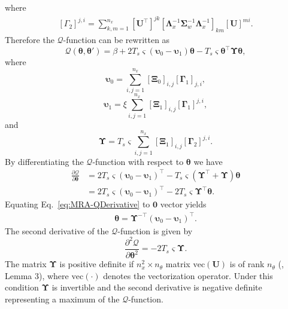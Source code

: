 \documentclass[review,authoryear,3p]{elsarticle}
\begin{document}
where
\begin{align}
\left[ \Gamma_2\right] ^{j,i}=\sum_{k,m=1}^{n_x}[\mathbf U^{\top}]^{jk} \left[\boldsymbol\Lambda_x^{-1}\boldsymbol\Sigma_w^{-1}\boldsymbol\Lambda_x^{-1} \right]_{km}[\mathbf U]^{mi}.
\end{align}
Therefore the $\mathcal Q$-function can be rewritten as
\begin{equation}\label{eq:MRA-QCompact}
\mathcal Q\left(\boldsymbol \theta,\boldsymbol\theta'\right)=\beta+2T_s\varsigma\left(\boldsymbol\upsilon_0-\boldsymbol\upsilon_1\right)\boldsymbol\theta-T_s\varsigma\boldsymbol\theta^\top\boldsymbol\Upsilon\boldsymbol\theta,
\end{equation}
where
\begin{equation}\label{eq:epsilon0}
\boldsymbol\upsilon_0=\sum_{i,j=1}^{n_x}[\boldsymbol\Xi_0]_{i,j}[\boldsymbol\Gamma_1]_{j,i},
\end{equation}
\begin{equation}\label{eq:epsilon1}
\boldsymbol\upsilon_1=\xi\sum_{i,j=1}^{n_x}[\boldsymbol\Xi_1]_{i,j}[\boldsymbol\Gamma_1]^{j,i},
\end{equation}                                                                                 
and
\begin{equation}\label{eq:Epsilon}
\boldsymbol\Upsilon=T_s\varsigma\sum_{i,j=1}^{n_x}[\boldsymbol\Xi_1]_{i,j}[\boldsymbol\Gamma_2]^{j,i}.
\end{equation}
By differentiating the $\mathcal Q$-function with respect to $\boldsymbol\theta$ we have
\begin{align}\label{eq:MRA-QDerivative}
\frac{\partial \mathcal Q}{\partial \boldsymbol\theta}&=2T_s\varsigma(\boldsymbol\upsilon_0-\boldsymbol\upsilon_1)^\top-T_s\varsigma(\boldsymbol\Upsilon^\top+\boldsymbol\Upsilon)\boldsymbol\theta \nonumber \\
&=2T_s\varsigma(\boldsymbol\upsilon_0-\boldsymbol\upsilon_1)^\top-2T_s\varsigma\boldsymbol\Upsilon^\top\boldsymbol\theta.
\end{align}
Equating Eq.~\eqref{eq:MRA-QDerivative} to $\mathbf 0$ vector yields
\begin{align}\label{eq:MRA-thetahat}
\boldsymbol \theta= \boldsymbol\Upsilon^{-\top}(\boldsymbol\upsilon_0-\boldsymbol\upsilon_1)^\top.
\end{align}
The second derivative of the $\mathcal Q$-function is given by
\begin{equation}
\frac{\partial^2\mathcal Q}{\partial\boldsymbol\theta^2}=-2T_s\varsigma\boldsymbol\Upsilon.
\end{equation}
The matrix $\boldsymbol\Upsilon$ is positive definite if $n_x^2\times n_{\theta}$ matrix $\mathrm{vec}(\mathbf U)$ is of rank $n_{\theta}$ (\citep{Dewar2009}, Lemma 3), where $\mathrm{vec}(\cdot)$ denotes the vectorization operator. Under this condition $\boldsymbol\Upsilon$ is  invertible and the second derivative is negative definite representing a maximum of the $\mathcal Q$-function. 
\end{document}

